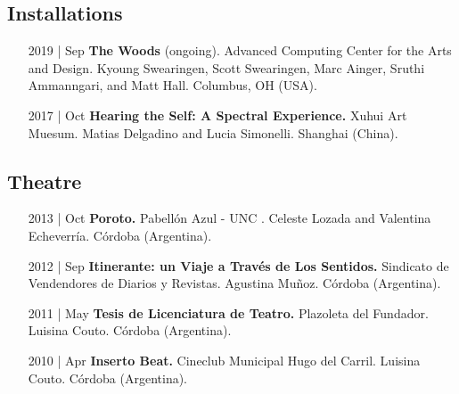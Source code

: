 \documentclass[12pt,overlapped]{res}%
\begin{document}
\begin{resume}
\subsection{Installations}%
\fullline%
\begin{itemize}[align=parleft,leftmargin=2.25cm,labelwidth=2cm]
\item[2019 | Sep]
\textbf{The Woods}
(ongoing). 
Advanced Computing Center for the Arts and Design. 
Kyoung Swearingen, Scott Swearingen, Marc Ainger, Sruthi Ammanngari, and Matt Hall. 
Columbus, OH (USA). 
\end{itemize}%
\begin{itemize}[align=parleft,leftmargin=2.25cm,labelwidth=2cm]
\item[2017 | Oct]
\textbf{Hearing the Self: A Spectral Experience.}
Xuhui Art Muesum. 
Matias Delgadino and Lucia Simonelli. 
Shanghai (China). 
\end{itemize}%
\subsection{Theatre}%
\fullline%
\begin{itemize}[align=parleft,leftmargin=2.25cm,labelwidth=2cm]
\item[2013 | Oct]
\textbf{Poroto.}
Pabellón Azul {-} UNC . 
Celeste Lozada and Valentina Echeverría. 
Córdoba (Argentina). 
\end{itemize}%
\begin{itemize}[align=parleft,leftmargin=2.25cm,labelwidth=2cm]
\item[2012 | Sep]
\textbf{Itinerante: un Viaje a Través de Los Sentidos.}
Sindicato de Vendendores de Diarios y Revistas. 
Agustina Muñoz. 
Córdoba (Argentina). 
\end{itemize}%
\begin{itemize}[align=parleft,leftmargin=2.25cm,labelwidth=2cm]
\item[2011 | May]
\textbf{Tesis de Licenciatura de Teatro.}
Plazoleta del Fundador. 
Luisina Couto. 
Córdoba (Argentina). 
\end{itemize}%
\begin{itemize}[align=parleft,leftmargin=2.25cm,labelwidth=2cm]
\item[2010 | Apr]
\textbf{Inserto Beat.}
Cineclub Municipal Hugo del Carril. 
Luisina Couto. 
Córdoba (Argentina). 
\end{itemize}%

\end{resume}
\end{document}
